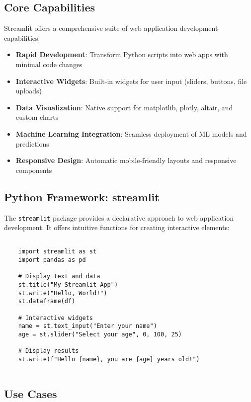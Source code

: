 \subsection{Core Capabilities}
\label{subsec:capabilities}

Streamlit offers a comprehensive suite of web application development capabilities:

\begin{itemize}
	\item \textbf{Rapid Development}: Transform Python scripts into web apps with minimal code changes
	\item \textbf{Interactive Widgets}: Built-in widgets for user input (sliders, buttons, file uploads)
	\item \textbf{Data Visualization}: Native support for matplotlib, plotly, altair, and custom charts
	\item \textbf{Machine Learning Integration}: Seamless deployment of ML models and predictions
	\item \textbf{Responsive Design}: Automatic mobile-friendly layouts and responsive components
\end{itemize}

\subsection{Python Framework: streamlit}
\label{subsec:streamlit}

The \texttt{streamlit} package provides a declarative approach to web application development. It offers intuitive functions for creating interactive elements:

\begin{lstlisting}[language=MyPython, caption={Streamlit Core Functions}, label={lst:streamlit_core}]
	
	import streamlit as st
	import pandas as pd
	
	# Display text and data
	st.title("My Streamlit App")
	st.write("Hello, World!")
	st.dataframe(df)
	
	# Interactive widgets
	name = st.text_input("Enter your name")
	age = st.slider("Select your age", 0, 100, 25)
	
	# Display results
	st.write(f"Hello {name}, you are {age} years old!")
	
\end{lstlisting}

\subsection{Use Cases}
\label{subsec:usecases}

